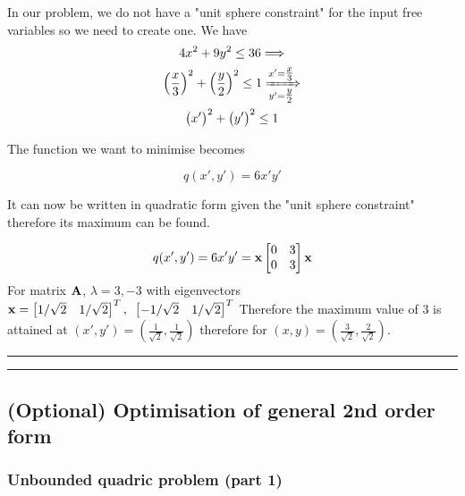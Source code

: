 \documentclass[a4paper]{article}
\numberwithin{equation}{section} %
\newcommand{\hquad}{\hskip0.5em\relax}%
\newcommand{\B}[1]{\textbf{\textup{#1}}} %
\begin{document}
\begin{TheSolution}
In our problem, we do not have a "unit sphere constraint" for the input free variables so we need to create one. We have\\
\[
\begin{gathered}
4x^2+9y^2 \leq 36 \Longrightarrow \\
\Big(\frac{x}{3}\Big)^2 + \Big(\frac{y}{2}\Big)^2 \leq 1 \xRightarrow[y'=\tfrac{y}{2}]{x'=\tfrac{x}{3}}\\
\big(x' \big)^2 + \big(y' \big)^2 \leq 1 
\end{gathered}
\]

The function we want to minimise becomes

\[
q(x',y')=6x'y'
\]

It can now be written in quadratic form given the "unit sphere constraint" therefore its maximum can be found.

\[
q(x',y')=6x'y'=\B{x}\begin{bmatrix}0 & 3\\0 & 3 \end{bmatrix}\B{x}
\]
For matrix $\B{A}$, $\lambda=3,-3$ with eigenvectors $\B{x}=\begin{bmatrix}1/\sqrt{2} & 1/\sqrt{2} \end{bmatrix}^T, \hquad \begin{bmatrix}-1/\sqrt{2} & 1/\sqrt{2} \end{bmatrix}^T$
Therefore the maximum value of $3$ is attained at $(x',y')=(\tfrac{1}{\sqrt{2}},\tfrac{1}{\sqrt{2}})$ therefore for $(x,y)=(\tfrac{3}{\sqrt{2}},\tfrac{2}{\sqrt{2}})$.
\end{TheSolution}
{\centering
{\Large {}\rule{0.3\textwidth}{0.4pt}\hspace{0.2cm}  \hspace{0.2cm} \rule{0.3\textwidth }{0.4pt}}\par
}


\subsection{(Optional) Optimisation of general 2nd order form}



\subsubsection{Unbounded quadric problem (part 1)}
\end{document}
